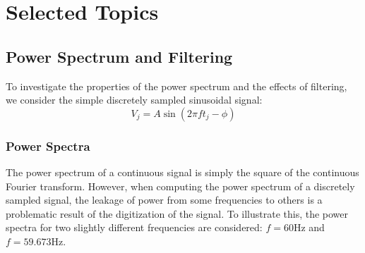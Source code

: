 \message{ !name(austin_report.tex)}\documentclass[11pt, letterpage]{article}
\begin{document}


\section{Selected Topics}
\subsection{Power Spectrum and Filtering}
To investigate the properties of the power spectrum and the effects of
filtering, we consider the simple discretely sampled sinusoidal signal:
\begin{equation}
  V_j = A \sin(2 \pi f t_j - \phi)
  \label{eq:sine}
\end{equation}


\subsubsection{Power Spectra}
The power spectrum of a continuous signal is simply the square of the continuous
Fourier transform. However, when computing the power spectrum of a discretely
sampled signal, the leakage of power from some frequencies to others is a
problematic result of the digitization of the signal. To illustrate this, the
power spectra for two slightly different frequencies are considered: $f = 60$Hz
and $f = 59.673$Hz.
\end{document}
